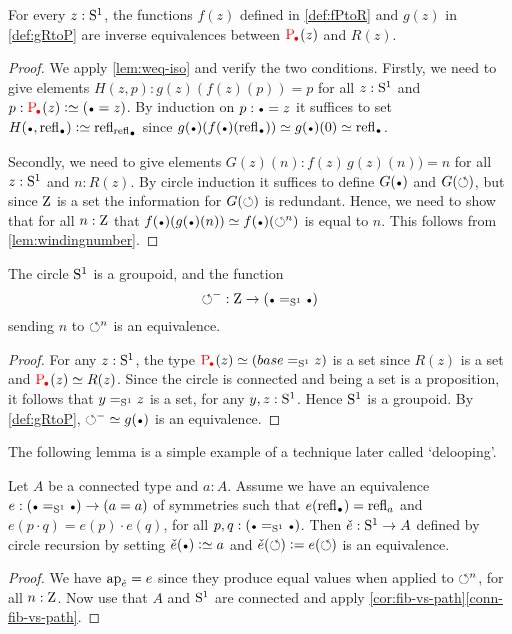 \begin{lemma}
  \label{lem:univisexp}
For every $z:{\mathrm{S}^1}$, the functions $f(z)$ defined in \cref{def:fPtoR} 
and $g(z)$ in \cref{def:gRtoP} are inverse equivalences between
$\uc{\base}(z)$ and $R(z)$.
\end{lemma}
\begin{proof}
We apply \cref{lem:weq-iso} and verify the two conditions.
  Firstly, we need to give elements $H(z,p):g(z)(f(z)(p))=p$
for all $z:{\mathrm{S}^1}$ and $p:\uc{\base}(z)\defeq(\base=z)$. 
By induction on $p:\base=z$ it suffices to set 
$H(\base,\refl\base)\defeq\refl{\refl{\base}}$ since
$g(\base)(f(\base)(\refl{\base}))\jdeq g(\base)(0)\jdeq\refl{\base}$.

Secondly, we need to give elements $G(z)(n):f(z)\,g(z)(n))=n$
for all $z:{\mathrm{S}^1}$ and $n: R(z)$.
By circle induction it suffices to define $G(\base)$ and $G(\circlearrowleft)$,
but since $\mathrm{Z}$ is a set the information for $G(\circlearrowleft)$ is redundant.
Hence, we need to show that for all $n:\mathrm{Z}$ that 
$f(\base)(g(\base)(n))\jdeq  f(\base)(\Sloop^n)$ is equal to $n$.  
This follows from \cref{lem:windingnumber}. 
\end{proof}


\begin{corollary}\label{cor:S1groupoid}
The circle ${\mathrm{S}^1}$ is a groupoid, and the function
\[
{\Sloop}^{-} : \zet\to(\base=_{\Sc}\base)
\]
sending $n$ to $\circlearrowleft^n$ is an equivalence.
\end{corollary}
\begin{proof}
For any $z:{\mathrm{S}^1}$, the type $\uc{\base}(z)\jdeq (base=_{\Sc}z)$ is a set 
since $R(z)$ is a set and $\uc{\base}(z) \equiv R(z)$.
Since the circle is connected and being a set is a proposition, it follows
that $y=_{{\mathrm{S}^1}}z$ is a set, for any $y,z:{\mathrm{S}^1}$. Hence ${\mathrm{S}^1}$ is a groupoid.
By \cref{def:gRtoP}, ${\Sloop}^{-}\jdeq g(\base)$ is an equivalence.
\end{proof}

The following lemma is a simple example of a technique later called `delooping'.
\begin{lemma}\label{lem:S1-delooping}
Let $A$ be a connected type and $a:A$. 
Assume we have an equivalence $e:(\base=_{\Sc}\base) \to (a=a)$
of symmetries such that $e(\refl{\base})=\refl{a}$
and $e(p\cdot q)=e(p)\cdot e(q)$, for all $p,q:(\base=_{\Sc}\base)$.
Then $\check e : {\mathrm{S}^1}\to A$ defined by circle recursion by setting
$\check e(\base)\defeq a$ and $\check e(\circlearrowleft)\mathrel{\vcentcolon=} e(\circlearrowleft)$
is an equivalence.
\end{lemma}
\begin{proof}
We have $\ap{\check e} = e$ since they produce equal values when applied
to $\circlearrowleft^n$, for all $n:\mathrm{Z}$. Now use that $A$ and ${\mathrm{S}^1}$ are connected and
apply \cref{cor:fib-vs-path}\ref{conn-fib-vs-path}.
\end{proof}


